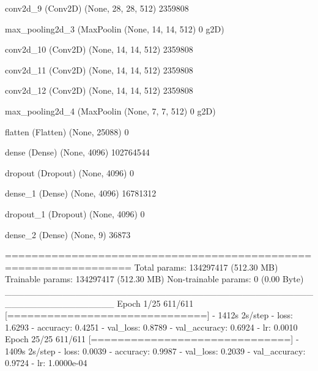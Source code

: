 \documentclass[11pt, a4paper]{article} %
\begin{document}
 conv2d_9 (Conv2D)           (None, 28, 28, 512)       2359808   
                                                                 
 max_pooling2d_3 (MaxPoolin  (None, 14, 14, 512)       0         
 g2D)                                                            
                                                                 
 conv2d_10 (Conv2D)          (None, 14, 14, 512)       2359808   
                                                                 
 conv2d_11 (Conv2D)          (None, 14, 14, 512)       2359808   
                                                                 
 conv2d_12 (Conv2D)          (None, 14, 14, 512)       2359808   
                                                                 
 max_pooling2d_4 (MaxPoolin  (None, 7, 7, 512)         0         
 g2D)                                                            
                                                                 
 flatten (Flatten)           (None, 25088)             0         
                                                                 
 dense (Dense)               (None, 4096)              102764544 
                                                                 
 dropout (Dropout)           (None, 4096)              0         
                                                                 
 dense_1 (Dense)             (None, 4096)              16781312  
                                                                 
 dropout_1 (Dropout)         (None, 4096)              0         
                                                                 
 dense_2 (Dense)             (None, 9)                 36873     
                                                                 
=================================================================
Total params: 134297417 (512.30 MB)
Trainable params: 134297417 (512.30 MB)
Non-trainable params: 0 (0.00 Byte)
_________________________________________________________________
Epoch 1/25
611/611 [==============================] - 1412s 2s/step - loss: 1.6293 - accuracy: 0.4251 - val_loss: 0.8789 - val_accuracy: 0.6924 - lr: 0.0010
Epoch 25/25
611/611 [==============================] - 1409s 2s/step - loss: 0.0039 - accuracy: 0.9987 - val_loss: 0.2039 - val_accuracy: 0.9724 - lr: 1.0000e-04
\end{document}
